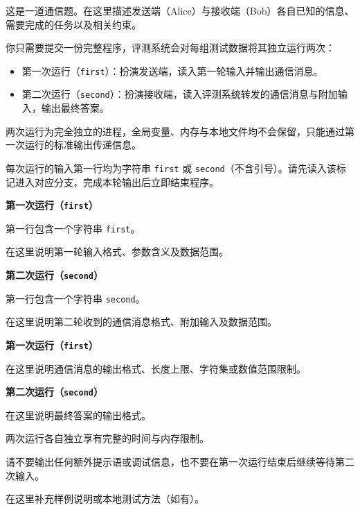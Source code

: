 这是一道通信题。在这里描述发送端（Alice）与接收端（Bob）各自已知的信息、需要完成的任务以及相关约束。

你只需要提交一份完整程序，评测系统会对每组测试数据将其独立运行两次：

\begin{itemize}
\item 第一次运行（\texttt{first}）：扮演发送端，读入第一轮输入并输出通信消息。
\item 第二次运行（\texttt{second}）：扮演接收端，读入评测系统转发的通信消息与附加输入，输出最终答案。
\end{itemize}

两次运行为完全独立的进程，全局变量、内存与本地文件均不会保留，只能通过第一次运行的标准输出传递信息。

每次运行的输入第一行均为字符串 \texttt{first} 或 \texttt{second}（不含引号）。请先读入该标记进入对应分支，完成本轮输出后立即结束程序。

\InputFile

\textbf{第一次运行（\texttt{first}）}

第一行包含一个字符串 \texttt{first}。

在这里说明第一轮输入格式、参数含义及数据范围。

\textbf{第二次运行（\texttt{second}）}

第一行包含一个字符串 \texttt{second}。

在这里说明第二轮收到的通信消息格式、附加输入及数据范围。

\OutputFile

\textbf{第一次运行（\texttt{first}）}

在这里说明通信消息的输出格式、长度上限、字符集或数值范围限制。

\textbf{第二次运行（\texttt{second}）}

在这里说明最终答案的输出格式。

\Note

两次运行各自独立享有完整的时间与内存限制。

请不要输出任何额外提示语或调试信息，也不要在第一次运行结束后继续等待第二次输入。

在这里补充样例说明或本地测试方法（如有）。
